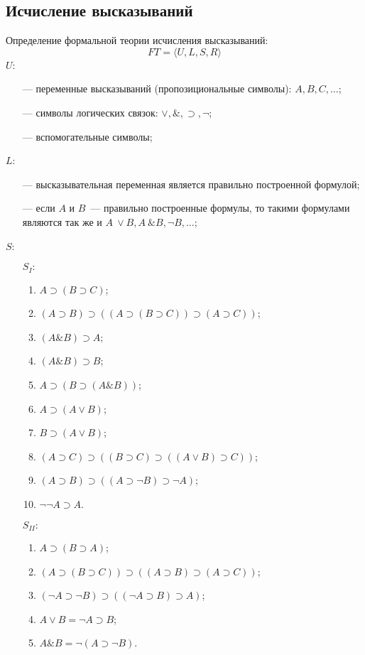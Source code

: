 \documentclass[a4paper,12pt]{report}
\begin{document}
\subsection{Исчисление высказываний}
	Определение формальной теории исчисления высказываний:
	$$ FT = \langle U, L, S, R \rangle $$
	$ U $:
	\begin{itemize}
		\item[---] переменные высказываний (пропозициональные символы):
			$ A, B, C, \dots $;
		\item[---] символы логических связок: $ \vee, \&, \supset, \neg $;
		\item[---] вспомогательные символы;
	\end{itemize}
	$ L $:
	\begin{itemize}
		\item[---] высказывательная переменная является правильно построенной
			формулой;
		\item[---] если $ A $ и $ B $~--- правильно построенные формулы, то такими
			формулами являются так же и $ A~\vee B, A~\& B, \neg B, \dots $;
	\end{itemize}
	$ S $:
	\begin{itemize}
		\item[$ S_{I}: $]
			\begin{enumerate}
				\item $ A \supset (B \supset C) $;
				\item $ (A \supset B) \supset ((A \supset (B \supset C)) \supset (A
					\supset C)) $;
				\item $ (A \& B) \supset A $;
				\item $ (A \& B) \supset B $;
				\item $ A \supset (B \supset (A \& B)) $;
				\item $ A \supset (A \vee B) $;
				\item $ B \supset (A \vee B) $;
				\item $ (A \supset C) \supset ((B \supset C) \supset ((A \vee B)
					\supset C)) $;
				\item $ (A \supset B) \supset ((A \supset \neg B) \supset \neg A) $;
				\item $ \neg \neg A \supset A $.
			\end{enumerate}
		\item[$ S_{II}:  $]
			\begin{enumerate}
				\item $ A \supset (B \supset A) $;
				\item $ (A \supset (B \supset C)) \supset ((A \supset B) \supset (A
					\supset C)) $;
				\item $ (\neg A \supset \neg B) \supset ((\neg A \supset B) \supset A)
					$;
				\item $ A \vee B = \neg A \supset B $;
				\item $ A \& B = \neg(A \supset \neg B) $.
			\end{enumerate}
	\end{itemize}
\end{document}
